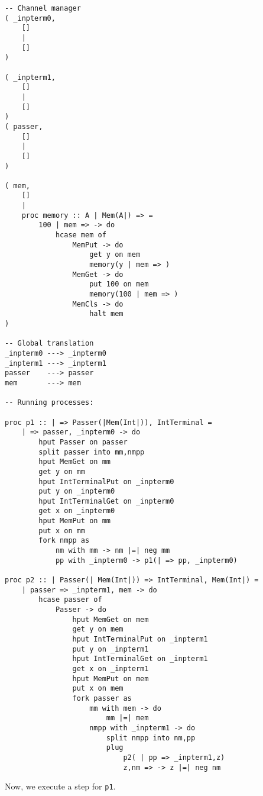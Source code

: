 \documentclass{article}
\theoremstyle{plain}%
\theoremstyle{definition}
\theoremstyle{remark}
\begin{document}
\begin{verbatim}
-- Channel manager
( _inpterm0,  
    []
    |
    []
)

( _inpterm1,  
    []
    |
    []
)
( passer,
    []
    |
    []
)

( mem,
    []
    |
    proc memory :: A | Mem(A|) => =
        100 | mem => -> do
            hcase mem of
                MemPut -> do
                    get y on mem
                    memory(y | mem => )
                MemGet -> do
                    put 100 on mem
                    memory(100 | mem => )
                MemCls -> do
                    halt mem
)

-- Global translation
_inpterm0 ---> _inpterm0 
_inpterm1 ---> _inpterm1 
passer    ---> passer 
mem       ---> mem

-- Running processes:

proc p1 :: | => Passer(|Mem(Int|)), IntTerminal = 
    | => passer, _inpterm0 -> do
        hput Passer on passer
        split passer into mm,nmpp
        hput MemGet on mm 
        get y on mm
        hput IntTerminalPut on _inpterm0
        put y on _inpterm0
        hput IntTerminalGet on _inpterm0
        get x on _inpterm0
        hput MemPut on mm
        put x on mm
        fork nmpp as
            nm with mm -> nm |=| neg mm
            pp with _inpterm0 -> p1(| => pp, _inpterm0)

proc p2 :: | Passer(| Mem(Int|)) => IntTerminal, Mem(Int|) =
    | passer => _inpterm1, mem -> do
        hcase passer of
            Passer -> do
                hput MemGet on mem
                get y on mem
                hput IntTerminalPut on _inpterm1
                put y on _inpterm1
                hput IntTerminalGet on _inpterm1
                get x on _inpterm1
                hput MemPut on mem
                put x on mem
                fork passer as
                    mm with mem -> do
                        mm |=| mem
                    nmpp with _inpterm1 -> do
                        split nmpp into nm,pp
                        plug
                            p2( | pp => _inpterm1,z)
                            z,nm => -> z |=| neg nm

\end{verbatim}
Now, we execute a step for \verb|p1|.
\end{document}
